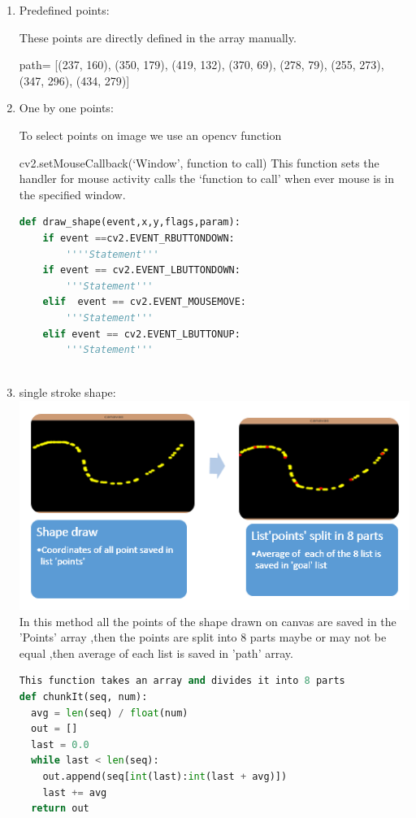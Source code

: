 \documentclass[main.tex]{subfiles}
\begin{document}
\begin{enumerate}
\item Predefined points:

These points are directly defined in the array manually.

path= [(237, 160), (350, 179), (419, 132), (370, 69), (278, 79), (255, 273), (347, 296), (434, 279)]

\item One by one points:

To select points on image we use an opencv function 

cv2.setMouseCallback(`Window', function to call)
This function sets the handler for mouse activity calls the `function to call' when ever mouse is in the specified window.
\pagebreak
\begin{lstlisting}[language=Python, caption = Mouse activity call back function]
def draw_shape(event,x,y,flags,param):
    if event ==cv2.EVENT_RBUTTONDOWN:
    	''''Statement'''
    if event == cv2.EVENT_LBUTTONDOWN:
    	'''Statement'''
    elif  event == cv2.EVENT_MOUSEMOVE:
    	'''Statement'''            
    elif event == cv2.EVENT_LBUTTONUP:
    	'''Statement'''
        
\end{lstlisting}

\item single stroke shape:
\\
\includegraphics[scale=1]{images/shapedraw.png}
In this method all the points of the shape drawn on canvas are saved in the 'Points' array ,then the points are split into 8 parts maybe or may not be equal ,then average of each list is saved in 'path' array.

\begin{lstlisting}[language=Python, caption = Point selection from a shape]
This function takes an array and divides it into 8 parts
def chunkIt(seq, num):
  avg = len(seq) / float(num)
  out = []
  last = 0.0
  while last < len(seq):
    out.append(seq[int(last):int(last + avg)])
    last += avg
  return out


\end{lstlisting}
\end{enumerate}
\end{document}
